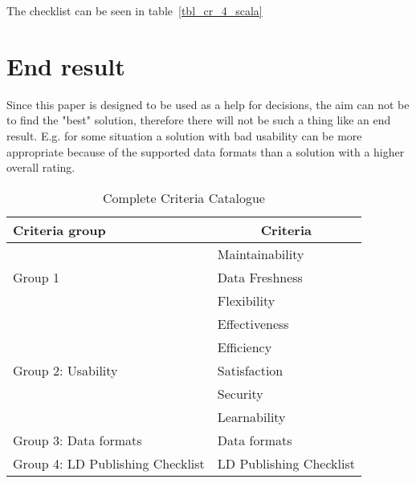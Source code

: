 The checklist can be seen in table~\ref{tbl_cr_4_scala}

\section{End result}

Since this paper is designed to be used as a help for decisions, the aim can not be to find the "best" solution, therefore there will not be such a thing like an end result. E.g. for some situation a solution with bad usability can be more appropriate because of the supported data formats than a solution with a higher overall rating.

\begin{table}[htb]
\begin{tabular}{|l|l|}
\hline
\textbf{Criteria group}             & \multicolumn{1}{c|}{\textbf{Criteria}} \\ \hline
\multirow{3}{*}{Group 1}            & Maintainability                        \\ \cline{2-2} 
                                    & Data Freshness                         \\ \cline{2-2} 
                                    & Flexibility                            \\ \hline
\multirow{5}{*}{Group 2: Usability} & Effectiveness                          \\ \cline{2-2} 
                                    & Efficiency                             \\ \cline{2-2} 
                                    & Satisfaction                           \\ \cline{2-2} 
                                    & Security                               \\ \cline{2-2} 
                                    & Learnability                           \\ \hline
Group 3: Data formats               & Data formats                           \\ \hline
Group 4: LD Publishing Checklist    & LD Publishing Checklist                \\ \hline
\end{tabular}
\centering
\caption{Complete Criteria Catalogue}
\label{tbl_cr_all}
\end{table}